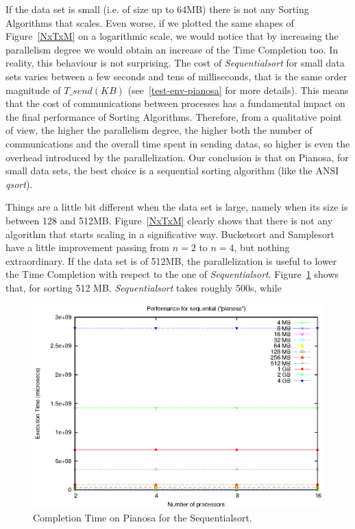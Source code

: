 If the data set is small (i.e. of size up to 64MB) there is not any Sorting Algorithms that scales. Even worse, if we plotted the same shapes of Figure~\ref{NxTxM} on a logarithmic scale, we would notice that by increasing the parallelism degree we would obtain an increase of the Time Completion too. In reality, this behaviour is not surprising. The cost of \textit{Sequentialsort} for small data sets varies between a few seconds and tens of milliseconds, that is the same order magnitude of $T\_send( KB )$ (see~\ref{test-env-pianosa} for more details). This means that the cost of communications between processes has a fundamental impact on the final performance of Sorting Algorithms. Therefore, from a qualitative point of view, the higher the parallelism degree, the higher both the number of communications and the overall time spent in sending datas, so higher is even the overhead introduced by the parallelization. Our conclusion is that on Pianosa, for small data sets, the best choice is a sequential sorting algorithm (like the ANSI \textit{qsort}).

Things are a little bit different when the data set is large, namely when its size is between 128 and 512MB. Figure~\ref{NxTxM} clearly shows that there is not any algorithm that starts scaling in a significative way. Bucketsort and Samplesort have a little improvement passing from $n=2$ to $n=4$, but nothing extraordinary. If the data set is of 512MB, the parallelization is useful to lower the Time Completion with respect to the one of \textit{Sequentialsort}. Figure~\ref{sequential-pianosa} shows that, for sorting 512 MB, \textit{Sequentialsort} takes roughly 500s, while 

\begin{figure}[!ht]
	\begin{center}
		\includegraphics[scale=0.6]{plots/test_01_pianosa/NxTxM/sequential_pianosa_NxTxM}
	\end{center}
  	\caption{Completion Time on Pianosa for the Sequentialsort.}
  	\label{sequential-pianosa}
\end{figure}

